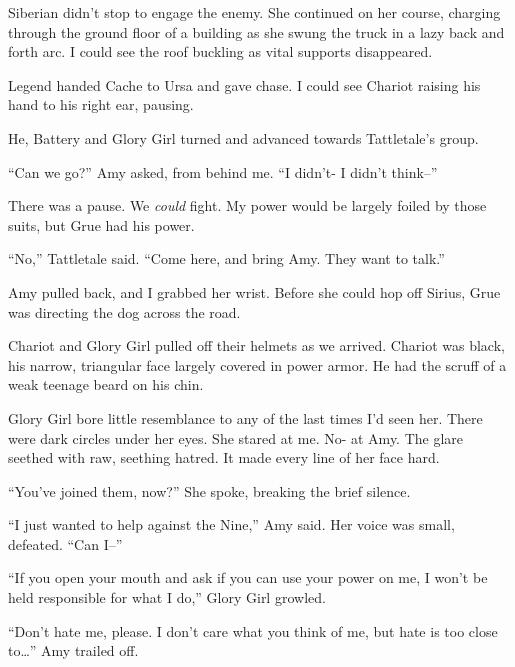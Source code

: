 Siberian didn't stop to engage the enemy.  She continued on her course, charging through the ground floor of a building as she swung the truck in a lazy back and forth arc.  I could see the roof buckling as vital supports disappeared.



Legend handed Cache to Ursa and gave chase.  I could see Chariot raising his hand to his right ear, pausing.



He, Battery and Glory Girl turned and advanced towards Tattletale's group.



``Can we go?''  Amy asked, from behind me.  ``I didn't- I didn't think--''



There was a pause.  We \emph{could} fight.  My power would be largely foiled by those suits, but Grue had his power.



``No,'' Tattletale said.  ``Come here, and bring Amy.  They want to talk.''



Amy pulled back, and I grabbed her wrist.  Before she could hop off Sirius, Grue was directing the dog across the road.



Chariot and Glory Girl pulled off their helmets as we arrived.  Chariot was black, his narrow, triangular face largely covered in power armor.  He had the scruff of a weak teenage beard on his chin.



Glory Girl bore little resemblance to any of the last times I'd seen her.  There were dark circles under her eyes.  She stared at me.  No- at Amy.  The glare seethed with raw, seething hatred.  It made every line of her face hard.



``You've joined them, now?''  She spoke, breaking the brief silence.



``I just wanted to help against the Nine,'' Amy said.  Her voice was small, defeated.  ``Can I--''



``If you open your mouth and ask if you can use your power on me, I won't be held responsible for what I do,'' Glory Girl growled.



``Don't hate me, please.  I don't care what you think of me, but hate is too close to\ldots''  Amy trailed off.



